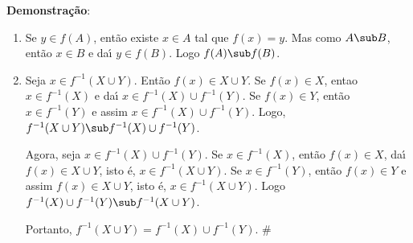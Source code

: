 \textbf{Demonstra{\c c}{\~a}o}: 
\begin{enumerate}
\item Se $y \in f(A)$, ent{\~a}o existe $x \in A$ tal que $f(x) = y$. Mas como $A \sub B$, ent{\~a}o $x \in B$ e da{\'\i} $y \in f(B)$. Logo $f(A) \sub f(B)$.

\item Seja $x \in f^{-1}(X \cup Y)$. Ent{\~a}o $f(x) \in X \cup Y$. Se $f(x) \in X$, entao $x \in f^{-1}(X)$ e da{\'\i} $x \in f^{-1}(X) \cup f^{-1}(Y)$. Se $f(x) \in Y$, ent{\~a}o $x \in f^{-1}(Y)$ e assim $x \in f^{-1}(X) \cup f^{-1}(Y)$. Logo, $f^{-1}(X \cup Y) \sub f^{-1}(X) \cup f^{-1}(Y)$.

Agora, seja $x \in f^{-1}(X) \cup f^{-1}(Y)$. Se $x \in f^{-1}(X)$, ent{\~a}o $f(x) \in X$, da{\'\i} $f(x) \in X \cup Y$, isto {\'e}, $x \in f^{-1}(X \cup Y)$. Se $x \in f^{-1}(Y)$, ent{\~a}o $f(x) \in Y$ e assim $f(x) \in X \cup Y$, isto {\'e}, $x \in f^{-1}(X \cup Y)$. Logo $f^{-1}(X) \cup f^{-1}(Y) \sub f^{-1}(X \cup Y)$.

Portanto, $f^{-1}(X \cup Y) = f^{-1}(X) \cup f^{-1}(Y)$. \#
\end{enumerate}